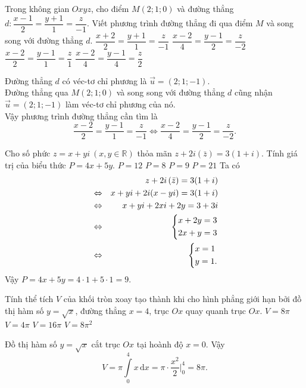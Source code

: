 \begin{ex}%
	Trong không gian $Oxyz$, cho điểm $M(2;1;0)$ và đường thẳng $d\colon\dfrac{x-1}{2}=\dfrac{y+1}{1}=\dfrac{z}{-1}$. Viết phương trình đường thẳng đi qua điểm $M$ và song song với đường thẳng $d$.
	\choice
	{$\dfrac{x+2}{2}=\dfrac{y+1}{1}=\dfrac{z}{-1}$}
	{\True $\dfrac{x-2}{4}=\dfrac{y-1}{2}=\dfrac{z}{-2}$}
	{$\dfrac{x-2}{2}=\dfrac{y-1}{1}=\dfrac{z}{1}$}
	{$\dfrac{x-2}{4}=\dfrac{y-1}{4}=\dfrac{z}{2}$}
	\loigiai
	{
		Đường thẳng $d$ có véc-tơ chỉ phương là $\vec{u}=(2;1;-1)$.\\
		Đường thẳng qua $M(2;1;0)$ và song song với đường thẳng $d$ cũng nhận $\vec{u}=(2;1;-1)$ làm véc-tơ chỉ phương của nó.\\
		Vậy phương trình đường thẳng cần tìm là
		\[\dfrac{x-2}{2}=\dfrac{y-1}{1}=\dfrac{z}{-1} \Leftrightarrow\dfrac{x-2}{4}=\dfrac{y-1}{2}=\dfrac{z}{-2}.\]
		
	}
\end{ex}

\begin{ex}%
	Cho số phức $z=x+yi~(x,y \in \mathbb{R})$ thỏa mãn $z+2i\left(\bar{z}\right)=3(1+i)$. Tính giá trị của biểu thức $P=4x+5y$.
	\choice
	{$P=12$}
	{$P=8$}
	{\True $P=9$}
	{$P=21$}
	\loigiai
	{
		Ta có 
		\begin{eqnarray*}
			& &z+2i\left(\bar{z}\right)=3(1+i) \\
			& \Leftrightarrow & x+yi+2i(x-yi)=3(1+i) \\
			& \Leftrightarrow & x+yi+2xi+2y=3+3i \\
			& \Leftrightarrow & \left\{\begin{aligned}&x+2y=3\\&2x+y=3\end{aligned}\right.\\
			& \Leftrightarrow & \left\{\begin{aligned}&x=1\\&y=1.\end{aligned}\right.
		\end{eqnarray*}
	Vậy $P=4x+5y=4\cdot1+5\cdot1=9.$
	}
\end{ex}

\begin{ex}%
	Tính thể tích $V$ của khối tròn xoay tạo thành khi cho hình phẳng giới hạn bởi đồ thị hàm số $y=\sqrt{x}$, đường thẳng $x=4$, trục $Ox$ quay quanh trục $Ox$.
	\choice
	{\True $V=8\pi$}
	{$V=4\pi$}
	{$V=16\pi$}
	{$V=8\pi^2$}
	\loigiai
	{
		Đồ thị hàm số $y=\sqrt{x}$ cắt trục $Ox$ tại hoành độ $x=0$.	
		Vậy \[V=\pi\displaystyle\int\limits_0^4 x\mathrm{\,d}x=\pi\cdot\dfrac{x^2}{2}\bigg|_0^4=8\pi.\]
		
	}
\end{ex}


